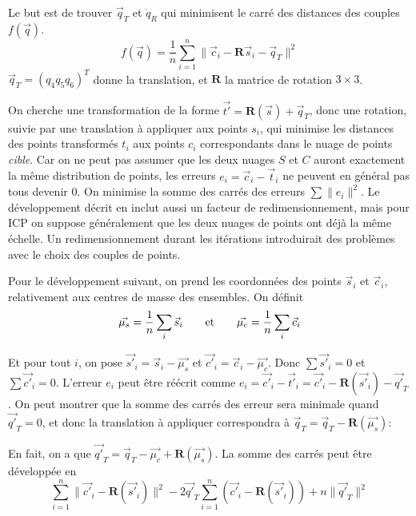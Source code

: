 \documentclass[a4paper,10pt]{scrreprt}
\begin{document}
Le but est de trouver $\vec{q}_T$ et $\dot{q}_R$ qui minimisent le carré des distances des couples $f(\vec{q})$.
\begin{equation*}
	f(\vec{q}) = \frac{1}{n} \sum_{i=1}^{n} \| \vec{c}_i - \mathbf{R} \vec{s}_i - \vec{q}_T \|^2
\end{equation*}
$\vec{q}_T = (q_4 q_5 q_6)^T$ donne la translation, et $\mathbf{R}$ la matrice de rotation $3 \times 3$.

On cherche une transformation de la forme $\vec{t'} = \mathbf{R}(\vec{s}) + \vec{q}_T$, donc une rotation, suivie par une translation à appliquer aux points $s_i$, qui minimise les distances des points transformés $t_i$ aux points $c_i$ correspondants dans le nuage de points \emph{cible}. Car on ne peut pas assumer que les deux nuages $S$ et $C$ auront exactement la même distribution de points, les erreurs $e_i = \vec{c}_i - \vec{t}_i$ ne peuvent en général pas tous devenir $0$. On minimise la somme des carrés des erreurs $\sum \| e_i \|^2$. Le développement décrit en \cite{Horn1986} inclut aussi un facteur de redimensionnement, mais pour ICP on suppose généralement que les deux nuages de points ont déjà la même échelle. Un redimensionnement durant les itérations introduirait des problèmes avec le choix des couples de points.

Pour le développement suivant, on prend les coordonnées des points $\vec{s}_i$ et $\vec{c}_i$, relativement aux centres de masse des ensembles. On définit
\begin{equation*}
	\vec{\mu_s} = \frac{1}{n} \sum_{i} \vec{s}_i
	\hspace{7mm} \text{et} \hspace{7mm}
	\vec{\mu_c} = \frac{1}{n} \sum_{i} \vec{c}_i
\end{equation*}

Et pour tout $i$, on pose $\vec{s'}_i = \vec{s}_i - \vec{\mu_s}$ et $\vec{c'}_i = \vec{c}_i - \vec{\mu_c}$. Donc $\sum \vec{s'}_i = 0$ et $\sum \vec{c'}_i = 0$. L'erreur $e_i$ peut être réécrit comme $e_i = \vec{c'}_i - \vec{t'}_i = \vec{c'}_i - \mathbf{R}(\vec{s'}_i) - \vec{q'}_T$. On peut montrer que la somme des carrés des erreur sera minimale quand $\vec{q'}_T = 0$, et donc la translation à appliquer correspondra à $\vec{q}_T = \vec{q}_T - \mathbf{R}(\vec{\mu_s})$:

En fait, on a que $\vec{q'}_T = \vec{q}_T - \vec{\mu_c} + \mathbf{R}(\vec{\mu_s})$. La somme des carrés peut être développée en
\begin{equation*}
	\sum_{i=1}^{n} \| \vec{c'}_i - \mathbf{R}(\vec{s'}_i) \|^2 - 2 \vec{q'}_T \sum_{i=1}^{n} (\vec{c'}_i - \mathbf{R}(\vec{s'}_i)) + n \|\vec{q'}_T\|^2
\end{equation*}
\end{document}
